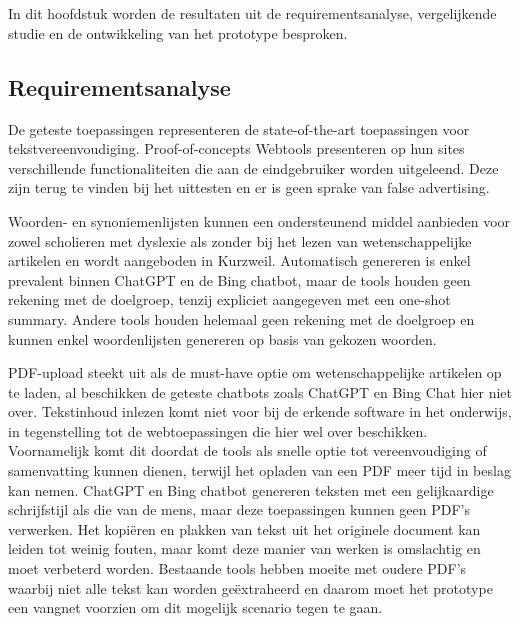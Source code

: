 
\chapter{}%
\label{ch:discussie}

In dit hoofdstuk worden de resultaten uit de requirementsanalyse, vergelijkende studie en de ontwikkeling van het prototype besproken. 

\section{Requirementsanalyse}


De geteste toepassingen representeren de state-of-the-art toepassingen voor tekstvereenvoudiging. Proof-of-concepts Webtools presenteren op hun sites verschillende functionaliteiten die aan de eindgebruiker worden uitgeleend. Deze zijn terug te vinden bij het uittesten en er is geen sprake van false advertising. 


Woorden- en synoniemenlijsten kunnen een ondersteunend middel aanbieden voor zowel scholieren met dyslexie als zonder bij het lezen van wetenschappelijke artikelen en wordt aangeboden in Kurzweil. Automatisch genereren is enkel prevalent binnen ChatGPT en de Bing chatbot, maar de tools houden geen rekening met de doelgroep, tenzij expliciet aangegeven met een one-shot summary. Andere tools houden helemaal geen rekening met de doelgroep en kunnen enkel woordenlijsten genereren op basis van gekozen woorden. 

\medspace

PDF-upload steekt uit als de must-have optie om wetenschappelijke artikelen op te laden, al beschikken de geteste chatbots zoals ChatGPT en Bing Chat hier niet over. Tekstinhoud inlezen komt niet voor bij de erkende software in het onderwijs, in tegenstelling tot de webtoepassingen die hier wel over beschikken. Voornamelijk komt dit doordat de tools als snelle optie tot vereenvoudiging of samenvatting kunnen dienen, terwijl het opladen van een PDF meer tijd in beslag kan nemen. ChatGPT en Bing chatbot genereren teksten met een gelijkaardige schrijfstijl als die van de mens, maar deze toepassingen kunnen geen PDF's verwerken. Het kopiëren en plakken van tekst uit het originele document kan leiden tot weinig fouten, maar komt deze manier van werken is omslachtig en moet verbeterd worden. Bestaande tools hebben moeite met oudere PDF's waarbij niet alle tekst kan worden geëxtraheerd en daarom moet het prototype een vangnet voorzien om dit mogelijk scenario tegen te gaan.

